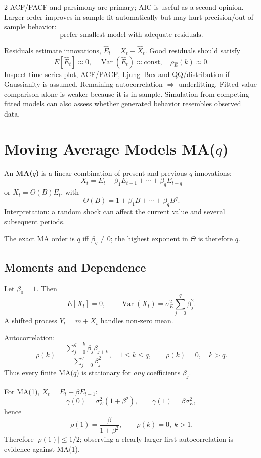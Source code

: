 \documentclass[9pt,a4paper]{extarticle}
\newcommand{\key}[1]{\textbf{#1}}
\begin{document}
\begin{multicols}{2}
ACF/PACF and parsimony are primary; AIC is useful as a second opinion. Larger order improves in-sample fit automatically but may hurt precision/out-of-sample behavior:
\[
\boxed{\text{prefer smallest model with adequate residuals}.}
\]

Residuals estimate innovations, \(\widehat E_t=X_t-\widehat X_t\). Good residuals should satisfy
\[
\boxed{E[\widehat E_t]\approx0,\quad
\operatorname{Var}(\widehat E_t)\approx\text{const},\quad
\rho_{\widehat E}(k)\approx0.}
\]
Inspect time-series plot, ACF/PACF, Ljung--Box and QQ/distribution if Gaussianity is assumed. Remaining autocorrelation \(\Rightarrow\) underfitting. Fitted-value comparison alone is weaker because it is in-sample. Simulation from competing fitted models can also assess whether generated behavior resembles observed data.

\section{Moving Average Models MA($q$)}

An \key{MA($q$)} is a linear combination of present and previous \(q\) innovations:
\[
\boxed{X_t=E_t+\beta_1E_{t-1}+\cdots+\beta_qE_{t-q}}
\]
or \(X_t=\Theta(B)E_t\), with
\[
\Theta(B)=1+\beta_1B+\cdots+\beta_qB^q.
\]
Interpretation: a random shock can affect the current value and several subsequent periods.

The exact MA order is \(q\) iff \(\beta_q\neq0\); the highest exponent in \(\Theta\) is therefore \(q\).

\subsection{Moments and Dependence}

Let \(\beta_0=1\). Then
\[
E[X_t]=0,\qquad
\boxed{\operatorname{Var}(X_t)=\sigma_E^2\sum_{j=0}^q\beta_j^2}.
\]
A shifted process \(Y_t=m+X_t\) handles non-zero mean.

Autocorrelation:
\[
\boxed{\rho(k)=
\frac{\sum_{j=0}^{q-k}\beta_j\beta_{j+k}}
{\sum_{j=0}^q\beta_j^2},\quad 1\le k\le q},
\qquad
\boxed{\rho(k)=0,\quad k>q.}
\]
Thus every finite MA($q$) is stationary for \emph{any} coefficients \(\beta_j\).

For MA(1), \(X_t=E_t+\beta E_{t-1}\):
\[
\gamma(0)=\sigma_E^2(1+\beta^2),\qquad
\gamma(1)=\beta\sigma_E^2,
\]
hence
\[
\boxed{\rho(1)=\frac{\beta}{1+\beta^2}},\qquad \rho(k)=0,\ k>1.
\]
Therefore \(\boxed{|\rho(1)|\le1/2}\); observing a clearly larger first autocorrelation is evidence against MA(1).


\end{multicols}
\end{document}
